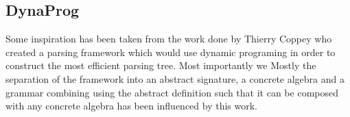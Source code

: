 \subsection{DynaProg}
Some inspiration has been taken from the work done by Thierry Coppey who created a parsing framework which would use dynamic programing in order to construct the most efficient parsing tree. Most importantly we 
Mostly the separation of the framework into an abstract signature, a concrete algebra and a grammar combining using the abstract definition such that it can be composed with any concrete algebra has been influenced by this work.
